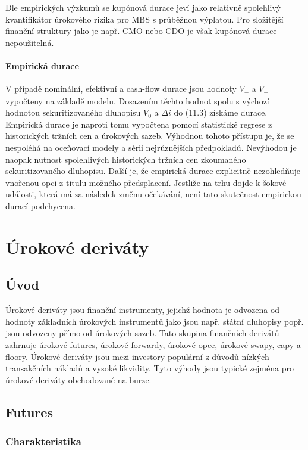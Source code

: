 \documentclass[a4paper]{book}
\begin{document}
Dle empirických výzkumů se kupónová durace jeví jako relativně spolehlivý kvantifikátor úrokového rizika pro MBS s průběžnou výplatou. Pro složitější finanční struktury jako je např. CMO nebo CDO je však kupónová durace nepoužitelná.

\subsubsection{Empirická durace}

V případě nominální, efektivní a cash-flow durace jsou hodnoty $V_{-}$ a $V_{+}$ vypočteny na základě modelu. Dosazením těchto hodnot spolu s výchozí hodnotou sekuritizovaného dluhopisu $V_0$ a $\Delta i$ do (11.3) získáme durace. Empirická durace je naproti tomu vypočtena pomocí statistické regrese z historických tržních cen a úrokových sazeb. Výhodnou tohoto přístupu je, že se nespoléhá na oceňovací modely a sérii nejrůznějších předpokladů. Nevýhodou je naopak nutnost spolehlivých historických tržních cen zkoumaného sekuritizovaného dluhopisu. Další je, že empirická durace explicitně nezohledňuje vnořenou opci z titulu možného předsplacení. Jestliže na trhu dojde k šokové události, která má za následek změnu očekávání, není tato skutečnost empirickou durací podchycena.

\chapter{Úrokové deriváty}

\section{Úvod}

Úrokové deriváty jsou finanční instrumenty, jejichž hodnota je odvozena od hodnoty základních úrokových instrumentů jako jsou např. státní dluhopisy popř. jsou odvozeny přímo od úrokových sazeb. Tato skupina finančních derivátů zahrnuje úrokové futures, úrokové forwardy, úrokové opce, úrokové swapy, capy a floory. Úrokové deriváty jsou mezi investory populární z důvodů nízkých transakčních nákladů a vysoké likvidity. Tyto výhody jsou typické zejména pro úrokové deriváty obchodované na burze.

\section{Futures}

\subsection{Charakteristika}
\end{document}
